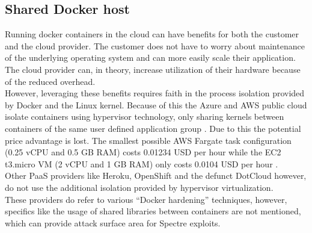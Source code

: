 \documentclass[conference,compsoc,final,a4paper]{IEEEtran}
\begin{document}
\subsection{Shared Docker host}
Running docker containers in the cloud can have benefits for both the customer and the cloud provider. The customer does not have to worry about maintenance
of the underlying operating system and can more easily scale their application. The cloud provider can, in theory, increase utilization of their hardware
because of the reduced overhead. \\
However, leveraging these benefits requires faith in the process isolation provided by Docker and the Linux kernel. Because of this the Azure and \ac{AWS} public
cloud isolate containers using hypervisor technology, only sharing kernels between containers of the same user defined application group
\cite{fargateIsolation, azureIsolation}. Due to this the
potential price advantage is lost. The smallest possible \ac{AWS} Fargate task configuration (0.25 vCPU and 0.5 GB RAM) costs 0.01234 USD per hour\cite{fargatePricing}
while the EC2 t3.micro VM (2 vCPU and 1 GB RAM) only costs 0.0104 USD per hour \cite{ec2Pricing}. \\
Other \ac{PaaS} providers like
Heroku\cite{herokuIsolation}, OpenShift\cite{openshiftIsolation} and the defunct DotCloud however, do not use the additional isolation provided
by hypervisor virtualization\cite{zhang2014cross}. \\
These providers do refer to various \enquote{Docker hardening} techniques, however, specifics like the usage of
shared libraries between containers are not mentioned, which can provide attack surface area for Spectre exploits. \cite{retpolineTurner}
\end{document}
